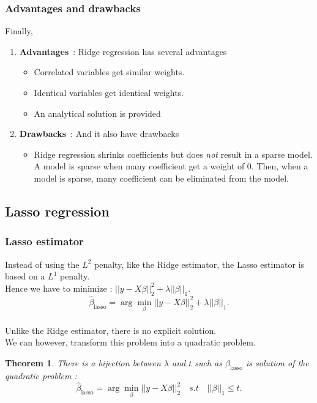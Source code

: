 \documentclass[a4paper,12pt]{article}
\newtheorem*{thm}{Theorem}
\begin{document}
\subsubsection{Advantages and drawbacks}
Finally,
\begin{enumerate}
\item \textbf{Advantages}~: Ridge regression has several advantages
\begin{itemize}
\item Correlated variables get similar weights.
\item Identical variables get identical weights.
\item An analytical solution is provided
\end{itemize}
\item \textbf{Drawbacks}~: And it also have drawbacks
\begin{itemize}
\item Ridge regression shrinks coefficients but does \emph{not} result in a sparse model. A model is sparse when many coefficient get a weight of $0$. Then, when a model is sparse, many coefficient can be eliminated from the model.
\end{itemize} 
\end{enumerate}

\subsection{Lasso regression}
\subsubsection{Lasso estimator}
Instead of using the $L^2$ penalty, like the Ridge estimator, the Lasso estimator is based on a $L^1$ penalty.\\ Hence we have to minimize : $||y - X\beta||_2^2 + \lambda ||\beta||_1$.\\ 
\begin{equation}
\hat{\beta}_\text{lasso} = \arg \min_\beta ||y - X\beta||_2^2 + \lambda ||\beta||_1.
\label{DefLagrange}
\end{equation}
~\\
Unlike the Ridge estimator, there is no explicit solution.\\
We can however, transform this problem into a quadratic problem.

\begin{thm} There is a bijection between $\lambda$ and $t$ such as ${\beta}_\text{lasso}$ is solution of the quadratic problem : 
\begin{equation}
\hat{\beta}_\text{lasso} = \arg \min_\beta ||y - X\beta||_2^2 \quad s.t \quad ||\beta||_1\leq t.
\label{DefQuadratic}
\end{equation}
\end{thm}
\end{document}
